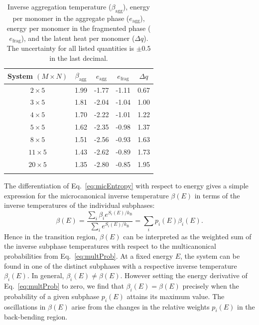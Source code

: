 \documentclass[12pt]{report}
\begin{document}
\newpage
%
\begin{table}
\caption{\label{tab:agg_Tab_1}%
Inverse aggregation temperature ($\beta_{\mathrm{agg}}$), energy per monomer in the aggregate phase ($e_{\mathrm{agg}}$), energy per monomer in the fragmented phase ($e_{\mathrm{frag}}$), and the latent heat per monomer ($\Delta q$). The uncertainty for all listed quantities is $\pm 0.5$ in the last decimal.}
\begin{tabular*}{\hsize}{@{\extracolsep{\fill}}ccccc@{}}
\hline
\hline
System $(M \times N)$& $\beta_{\mathrm{agg}}$ & $e_{\mathrm{agg}}$ &
$e_{\mathrm{frag}}$ & $\Delta q$\\
\hline
$2  \times 5$  &   1.99 &  -1.77 & -1.11 & 0.67\\
$3  \times 5$  &   1.81 &  -2.04 & -1.04 & 1.00\\
$4  \times 5$  &   1.70 &  -2.22 & -1.01 & 1.22\\
$5  \times 5$  &   1.62 &  -2.35 & -0.98 & 1.37\\
$8  \times 5$   &  1.51 &  -2.56 & -0.93 & 1.63\\
$11 \times 5$  &  1.43 &  -2.62 & -0.89 & 1.73\\
$20 \times 5$  &  1.35 &  -2.80 & -0.85 & 1.95\\
\\
\hline
\hline
\end{tabular*}
\end{table}
%

%
The differentiation of Eq.~\eqref{eq:micEntropy} with respect to energy gives a simple expression for the microcanonical inverse temperature $\beta(E)$ in terms of the inverse temperatures of the individual subphases:
%
\begin{equation}
\beta(E) = \frac{\sum_{i}\beta_{i}e^{S_{i}(E)/k_{\mathrm{B}}}}{
\sum_{i}e^{S_{i}(E)/k_{\mathrm{B}}}}
= \sum_{i} p_{i}(E)\beta_{i}(E).
\end{equation}
%
Hence in the transition region, $\beta(E)$ can be interpreted as the weighted sum of the inverse subphase temperatures with respect to the multicanonical probabilities from Eq.~\eqref{eq:multProb}. At a fixed energy $E$, the system can be found in one of the distinct subphases with a respective inverse temperature $\beta_{i}(E)$. In general, $\beta_{i}(E) \neq \beta(E)$. However setting the energy derivative of Eq.~\eqref{eq:multProb} to zero, we find that $\beta_{i}(E) = \beta(E)$ precisely when the probability of a given subphase $p_{i}(E)$ attains its maximum value. The oscillations in $\beta(E)$ arise from the changes in the relative weights $p_{i}(E)$ in the back-bending region.
%
\end{document}
